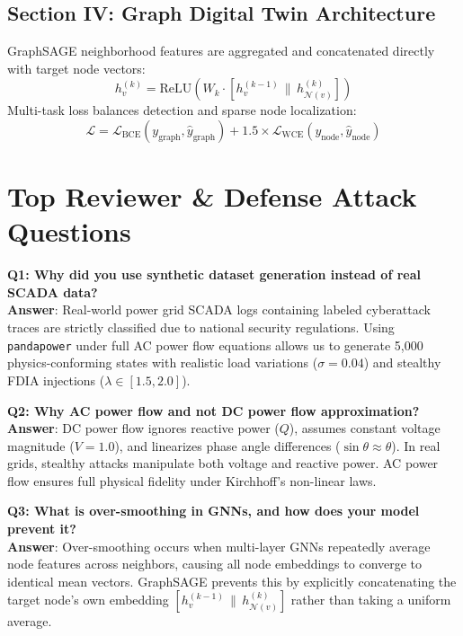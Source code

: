 \documentclass[11pt,a4paper]{article}
\begin{document}
\subsection{Section IV: Graph Digital Twin Architecture}
GraphSAGE neighborhood features are aggregated and concatenated directly with target node vectors:
\begin{equation}
h_v^{(k)} = \text{ReLU} \left( W_k \cdot \left[ h_v^{(k-1)} \,\|\, h_{\mathcal{N}(v)}^{(k)} \right] \right)
\end{equation}
Multi-task loss balances detection and sparse node localization:
\begin{equation}
\mathcal{L} = \mathcal{L}_{\text{BCE}}(y_{\text{graph}}, \hat{y}_{\text{graph}}) + 1.5 \times \mathcal{L}_{\text{WCE}}(y_{\text{node}}, \hat{y}_{\text{node}})
\end{equation}

\section{Top Reviewer \& Defense Attack Questions}

\begin{mdframed}[style=qastyle]
\textbf{Q1: Why did you use synthetic dataset generation instead of real SCADA data?}\\
\textbf{Answer}: Real-world power grid SCADA logs containing labeled cyberattack traces are strictly classified due to national security regulations. Using \texttt{pandapower} under full AC power flow equations allows us to generate 5,000 physics-conforming states with realistic load variations ($\sigma = 0.04$) and stealthy FDIA injections ($\lambda \in [1.5, 2.0]$).
\end{mdframed}

\begin{mdframed}[style=qastyle]
\textbf{Q2: Why AC power flow and not DC power flow approximation?}\\
\textbf{Answer}: DC power flow ignores reactive power ($Q$), assumes constant voltage magnitude ($V=1.0$), and linearizes phase angle differences ($\sin \theta \approx \theta$). In real grids, stealthy attacks manipulate both voltage and reactive power. AC power flow ensures full physical fidelity under Kirchhoff's non-linear laws.
\end{mdframed}

\begin{mdframed}[style=qastyle]
\textbf{Q3: What is over-smoothing in GNNs, and how does your model prevent it?}\\
\textbf{Answer}: Over-smoothing occurs when multi-layer GNNs repeatedly average node features across neighbors, causing all node embeddings to converge to identical mean vectors. GraphSAGE prevents this by explicitly concatenating the target node's own embedding $[h_v^{(k-1)} \,\|\, h_{\mathcal{N}(v)}^{(k)}]$ rather than taking a uniform average.
\end{mdframed}
\end{document}
